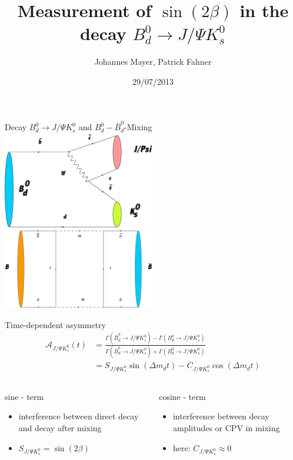 \documentclass{beamer}
\title[Measurement of $\sin(2\beta)$]{Measurement of $\sin(2\beta)$ in the decay $B_d^0 \longrightarrow J/\Psi K_s^0$}
\subtitle[]{}
\author[Johannes Mayer, Patrick Fahner]{Johannes Mayer, Patrick Fahner}
\institute[]{LHCb, Physikalisches Institut \\ Heidelberg University}
\date[29/07/13]{29/07/2013}
\begin{document}
\setlength\abovedisplayskip{0pt}
	\begin{frame}[plain]
	\titlepage
	\end{frame}
	
	\begin{frame}{Decay $B_d^0 \longrightarrow J/\Psi K_s^0$ and $B_d^0-\bar{B}_d^0$-Mixing}
	\includegraphics[width=0.5\textwidth]{Decay}
	\includegraphics[width=0.5\textwidth]{Mixing}
	\end{frame}

	
	\begin{frame}{Time-dependent asymmetry}
	\begin{align}
	\mathcal{A}_{J/\Psi K_s^0}(t) &= \frac{\Gamma(\bar{B}_d^0 \rightarrow J/\Psi K_s^0)-\Gamma(B_d^0 \rightarrow J/\Psi K_s^0)}{\Gamma(\bar{B}_d^0 \rightarrow J/\Psi K_s^0)+\Gamma(B_d^0 \rightarrow J/\Psi K_s^0)} \\
		&= S_{J/\Psi K_s^0}\sin(\Delta m_d t) - C_{J/\Psi K_s^0}\cos(\Delta m_d t)
	\end{align}
	\begin{columns}
	\begin{block}{sine - term}
	\begin{itemize}
		\item interference between direct decay and decay after mixing
		\item $S_{J/\Psi K_s^0} = \sin(2\beta)$
	\end{itemize}
	\end{block}
	
	\begin{block}{cosine - term}
	\begin{itemize}
		\item interference between decay amplitudes or CPV in mixing
		\item here: $C_{J/\Psi K_s^0} \approx 0$
	\end{itemize}
	\end{block}
	\end{columns}
	\end{frame}
	
\end{document}

